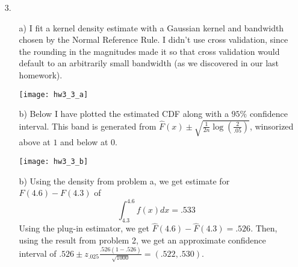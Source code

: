 \documentclass[11pt]{article}
\theoremstyle{definition}
\begin{document}
\begin{itemize}
\begin{itemize}
        \end{itemize}
    \item[3.]
        \begin{itemize}
            \item[a)]
                I fit a kernel density estimate with a Gaussian kernel and bandwidth chosen by the Normal Reference Rule. I didn't use cross validation, since the rounding in the magnitudes made it so that cross validation would default to an arbitrarily small bandwidth (as we discovered in our last homework).
                \begin{center}
                    \texttt{[image: hw3\_3\_a]}
                \end{center}
            \item[b)]
                Below I have plotted the estimated CDF along with a $95\%$ confidence interval. This band is generated from \(\hat F(x) \pm \sqrt{\frac{1}{2n}\log\left(\frac{2}{.05}\right)}\), winsorized above at $1$ and below at $0$.
                \begin{center}
                    \texttt{[image: hw3\_3\_b]}
                \end{center}
            \item[b)]
                Using the density from problem a, we get estimate for \(F(4.6)-F(4.3)\) of 
                \[\int_{4.3}^{4.6} f(x)dx = .533 \]
                Using the plug-in estimator, we get \(\hat F(4.6) - \hat F(4.3)=.526\). Then, using the result from problem 2, we get an approximate confidence interval of \(.526\pm z_{.025}\frac{.526(1-.526)}{\sqrt{1000}} = (.522,.530)\). 


\end{itemize}
\end{itemize}
\end{document}
